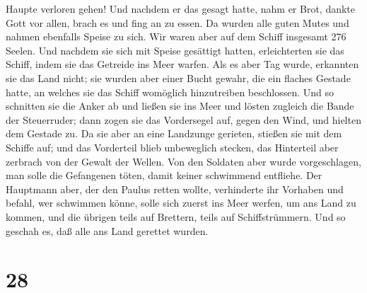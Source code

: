 Haupte verloren gehen!  Und nachdem er das gesagt hatte,
nahm er Brot, dankte Gott vor allen, brach es und fing an zu essen.
 Da wurden alle guten Mutes und nahmen ebenfalls Speise
zu sich.  Wir waren aber auf dem Schiff insgesamt 276
Seelen.  Und nachdem sie sich mit Speise gesättigt
hatten, erleichterten sie das Schiff, indem sie das Getreide ins Meer
warfen.  Als es aber Tag wurde, erkannten sie das Land
nicht; sie wurden aber einer Bucht gewahr, die ein flaches Gestade
hatte, an welches sie das Schiff womöglich hinzutreiben beschlossen.
 Und so schnitten sie die Anker ab und ließen sie ins
Meer und lösten zugleich die Bande der Steuerruder; dann zogen sie das
Vordersegel auf, gegen den Wind, und hielten dem Gestade zu.
 Da sie aber an eine Landzunge gerieten, stießen sie mit
dem Schiffe auf; und das Vorderteil blieb unbeweglich stecken, das
Hinterteil aber zerbrach von der Gewalt der Wellen.  Von
den Soldaten aber wurde vorgeschlagen, man solle die Gefangenen töten,
damit keiner schwimmend entfliehe.  Der Hauptmann aber,
der den Paulus retten wollte, verhinderte ihr Vorhaben und befahl, wer
schwimmen könne, solle sich zuerst ins Meer werfen, um ans Land zu
kommen, und die übrigen teils auf Brettern, teils auf Schiffstrümmern.
 Und so geschah es, daß alle ans Land gerettet wurden.

\hypertarget{section-27}{%
\section{28}\label{section-27}}

